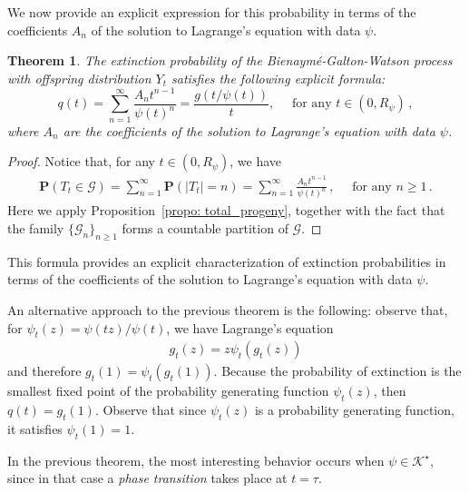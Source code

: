 \documentclass[11pt,a4paper,leqno]{amsart}
\theoremstyle{plain}
\newtheorem{theo}{Theorem}[section]
\theoremstyle{definition}
\numberwithin{equation}{section}
\def\P{\mathbf{P}}
\begin{document}
	We now provide an explicit expression for this probability in terms of the coefficients $A_n$ of the solution to Lagrange’s equation with data \( \psi \).
	\begin{theo}\label{thm:extinction_tree}
		The extinction probability of the Bienaymé-Galton-Watson process with offspring distribution \( Y_t \) satisfies the following explicit formula:
		\begin{equation}
			q(t) = \sum_{n=1}^{\infty} \frac{A_n t^{n-1}}{\psi(t)^n} = \frac{g(t/\psi(t))}{t}, \quad \text{ for any } t \in (0,R_{\psi})\,,
		\end{equation}
		where \( A_n \) are the coefficients of the solution to Lagrange’s equation with data \( \psi \).
	\end{theo}
	\begin{proof} Notice that, for any $t \in (0,R_{\psi})$, we have 
		\begin{align*}
			\P(T_t \in \mathcal{G}) = \sum_{n = 1}^{\infty}\P(|T_t| = n) = \sum_{n = 1}^{\infty}\frac{A_nt^{n-1}}{\psi(t)^n}\,, \quad \text{ for any } n \geq 1\,.
		\end{align*}
		Here we apply Proposition~\ref{propo: total_progeny}, together with the fact that the family \( \{\mathcal{G}_n\}_{n \geq 1} \) forms a countable partition of \( \mathcal{G} \).
	\end{proof}
	
	This formula provides an explicit characterization of extinction probabilities in terms of the coefficients of the solution to Lagrange's equation with data $\psi$.
	\smallskip
	
	An alternative approach to the previous theorem is the following: observe that, for $\psi_t(z) = \psi(tz)/\psi(t)$, we have Lagrange's equation
	\begin{align*}
		g_t(z) = z\psi_t(g_t(z))
	\end{align*}
	and therefore $g_t(1) = \psi_t(g_t(1))$. Because the probability of extinction is the smallest fixed point of the probability generating function $\psi_t(z)$, then $q(t) = g_t(1)$. Observe that since $\psi_t(z)$ is a probability generating function, it satisfies $\psi_t(1)=1$.
	\smallskip
	
	In the previous theorem, the most interesting behavior occurs when \(\psi\in\mathcal K^\star\), since in that case a \emph{phase transition} takes place at \(t=\tau\).
	\smallskip
	
\end{document}
